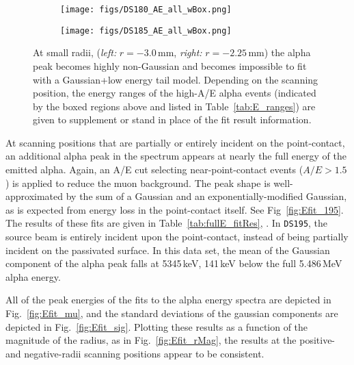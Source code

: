 \documentclass[groupedaddress,rmp,amsmath,amssymb,bibnotes,altaffilletter,twocolumn]{revtex4-1}
\begin{document}
\begin{figure*}[]
 \centering
 \begin{subfigure}[]{.45\textwidth}
 \texttt{[image: figs/DS180\_AE\_all\_wBox.png]}
\end{subfigure}
 \begin{subfigure}[]{.45\textwidth}
 \texttt{[image: figs/DS185\_AE\_all\_wBox.png]}
\end{subfigure}
 \caption{At small radii, ({\it left:} $r=-3.0$\,mm, {\it right:} $r=-2.25$\,mm) the alpha peak becomes highly non-Gaussian and becomes impossible to fit with a Gaussian+low energy tail model. Depending on the scanning position, the energy ranges of the high-A/E alpha events (indicated by the boxed regions above and listed in Table~\ref{tab:E_ranges}) are given to supplement or stand in place of the fit result information.} 
 \label{fig:AEvE}
\end{figure*}

At scanning positions that are partially or entirely incident on the point-contact, an additional alpha peak in the spectrum appears at nearly the full energy of the emitted alpha. Again, an A/E cut selecting near-point-contact events ($A/E>1.5$) is applied to reduce the muon background. The peak shape is well-approximated by the sum of a Gaussian and an exponentially-modified Gaussian, as is expected from energy loss in the point-contact itself. See Fig~\ref{fig:Efit_195}. The results of these fits are given in Table~\ref{tab:fullE_fitRes}, . In {\tt DS195}, the source beam is entirely incident upon the point-contact, instead of being partially incident on the passivated surface. In this data set, the mean of the Gaussian component of the alpha peak falls at 5345\,keV, 141\,keV below the full 5.486\,MeV alpha energy. 

All of the peak energies of the fits to the alpha energy spectra are depicted in Fig.~\ref{fig:Efit_mu}, and the standard deviations of the gaussian components are depicted in Fig.~\ref{fig:Efit_sig}. Plotting these results as a function of the magnitude of the radius, as in Fig.~\ref{fig:Efit_rMag}, the results at the positive- and negative-radii scanning positions appear to be consistent. 
\end{document}
